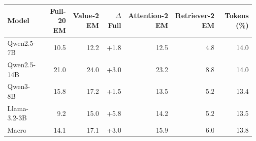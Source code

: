 \begin{tabular}{lrrrrrr}
\toprule
Model & Full-20 EM & Value-2 EM & $\Delta$Full & Attention-2 EM & Retriever-2 EM & Tokens (\%) \\
\midrule
Qwen2.5-7B & 10.5 & 12.2 & +1.8 & 12.5 & 4.8 & 14.0 \\
Qwen2.5-14B & 21.0 & 24.0 & +3.0 & 23.2 & 8.8 & 14.0 \\
Qwen3-8B & 15.8 & 17.2 & +1.5 & 13.5 & 5.2 & 13.4 \\
Llama-3.2-3B & 9.2 & 15.0 & +5.8 & 14.2 & 5.2 & 13.5 \\
\midrule
Macro & 14.1 & 17.1 & +3.0 & 15.9 & 6.0 & 13.8 \\
\bottomrule
\end{tabular}
